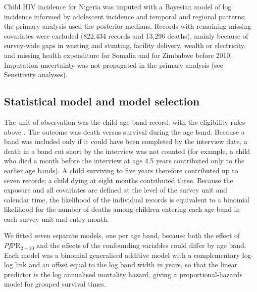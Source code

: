 Child HIV incidence for Nigeria was imputed with a Bayesian model of log incidence informed by adolescent incidence and temporal and regional patterns; the primary analysis used the posterior medians. Records with remaining missing covariates were excluded (822,434 records and 13,296 deaths), mainly because of survey-wide gaps in wasting and stunting, facility delivery, wealth or electricity, and missing health expenditure for Somalia and for Zimbabwe before 2010. Imputation uncertainty was not propagated in the primary analysis (see Sensitivity analyses).


\subsection*{Statistical model and model selection}

The unit of observation was the child age-band record, with the eligibility rules above \cite{Wakefield:19,Burstein:18}. The outcome was death versus survival during the age band. Because a band was included only if it could have been completed by the interview date, a death in a band cut short by the interview was not counted (for example, a child who died a month before the interview at age 4.5 years contributed only to the earlier age bands). A child surviving to five years therefore contributed up to seven records; a child dying at eight months contributed three. Because the exposure and all covariates are defined at the level of the survey unit and calendar time, the likelihood of the individual records is equivalent to a binomial likelihood for the number of deaths among children entering each age band in each survey unit and entry month.

We fitted seven separate models, one per age band, because both the effect of \textit{Pf}PR$_{2-10}$ and the effects of the confounding variables could differ by age band. Each model was a binomial generalised additive model with a complementary log-log link and an offset equal to the log band width in years, so that the linear predictor is the log annualised mortality hazard, giving a proportional-hazards model for grouped survival times.

